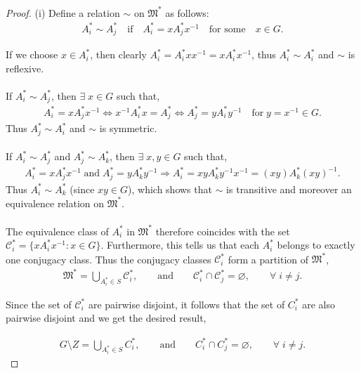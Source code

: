 \documentclass[a4paper , 11pt]{book}
\theoremstyle{definition}
\theoremstyle{remark}
\begin{document}
\begin{proof}
(i) Define a relation $\sim$ on  $\mathfrak{M}^*$  as follows:
\begin{align*} A_i^* \sim A_j^* \quad \text{if} \quad A_i^* = xA_j^*x^{-1} \quad \text{for some} \quad x \in G.
\end{align*}

\textbullet \space If we choose $x \in A_i^*$, then clearly $A_i^* = A_i^*xx^{-1} = xA_i^*x^{-1}$, thus $A_i^* \sim A_i^*$ and $\sim$ is reflexive.\\
\\
\textbullet \space If $A_i^* \sim A_j^*$, then $\exists \; x \in G$ such that,
\begin{align*} A_i^*= xA_j^*x^{-1} \iff x^{-1}A_i^*x = A_j^* \iff A_j^* = yA_i^*y^{-1} \quad \text{for} \; y = x^{-1} \in G.
\end{align*}
Thus $A_j^* \sim A_i^*$ and $\sim$ is symmetric.\\
\\
\textbullet \space If $A_i^* \sim A_j^*$ and $A_j^* \sim A_k^*$, then $\exists \; x, y \in G$  such that,
\begin{align*} A_i^* = xA_j^*x^{-1} \; \text{and} \; A_j^* = yA_k^*y^{-1} \Rightarrow A_i^* = xyA_k^*y^{-1}x^{-1} = (xy)A_k^*(xy)^{-1}.
\end{align*}
Thus $A_i^* \sim A_k^*$ (since $xy \in G$), which shows that $\sim$ is transitive and moreover an equivalence relation on $\mathfrak{M}^*$. \\
\\
The equivalence class of $A_i^*$ in $\mathfrak{M}^*$ therefore coincides with the set $\mathcal{C}_i^* = \{ xA_i^*x^{-1} : x \in G \}$. Furthermore, this tells us that each $A_i^*$ belongs to exactly one conjugacy class. Thus the conjugacy classes $\mathcal{C}_i^*$ form a partition of $\mathfrak{M}^*$,
\begin{align*} \mathfrak{M}^* = \bigcup\limits_{A_i^* \in S} \mathcal{C}_i^*,  \qquad \text{and}  \qquad \mathcal{C}_i^* \cap \mathcal{C}_j^* = \varnothing, \qquad \forall \; i \neq j.
\end{align*}

Since the set of $\mathcal{C}_i^*$ are pairwise disjoint, it follows that the set of $C_i^*$ are also pairwise disjoint and we get the desired result,

\begin{align*} G \! \setminus \! Z = \bigcup\limits_{A_i^* \in S} C_i^*,  \qquad \text{and}  \qquad C_i^* \cap C_j^* = \varnothing, \qquad \forall \; i \neq j.
\end{align*}


\end{proof}
\end{document}
